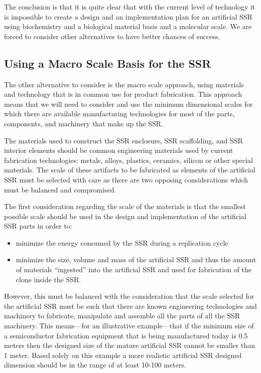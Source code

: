 The conclusion is that it is quite clear that with the current level of
technology it is impossible to create a design and an implementation
plan for an artificial SSR using biochemistry and a biological material
basis and a molecular scale. We are forced to consider other
alternatives to have better chances of success.

\subsection{Using a Macro Scale Basis for the SSR}

The other alternative to consider is the macro scale approach, using materials
and technology that is in common use for product fabrication.
This approach means that we will need to consider and use the minimum
dimensional scales for which there are available manufacturing
technologies for most of the parts, components, and machinery that make
up the SSR.  

The materials used to construct the SSR enclosure, SSR scaffolding, and
SSR interior elements should be common engineering materials used by current
fabrication technologies: metals, alloys, plastics, ceramics, silicon
or other special materials.  The scale of these artifacts to be fabricated 
as elements of the artificial SSR must be selected with care as there
are two opposing considerations which must be balanced and compromised.

The first consideration regarding the scale of the materials is that the 
smallest possible scale should be used in the design and
implementation of the artificial SSR parts in order to:

\begin{itemize}
\item minimize the energy consumed by the SSR during a replication cycle
\item minimize the size, volume and mass of the artificial SSR and thus
the amount of materials “ingested” into the artificial SSR and used for
fabrication of the clone inside the SSR.
\end{itemize}

However, this must be balanced with the consideration that the scale 
selected for the artificial SSR must be such that there
are known engineering technologies and machinery to fabricate,
manipulate and assemble all the parts of all the SSR machinery. This
means---for an illustrative example---that if the minimum size of a
semiconductor fabrication equipment that is being manufactured today is
0.5 meters then the designed size of the mature artificial SSR cannot
be smaller than 1 meter. Based solely on this example a more realistic artificial
SSR designed dimension should be in the range of at least 10-100
meters.

